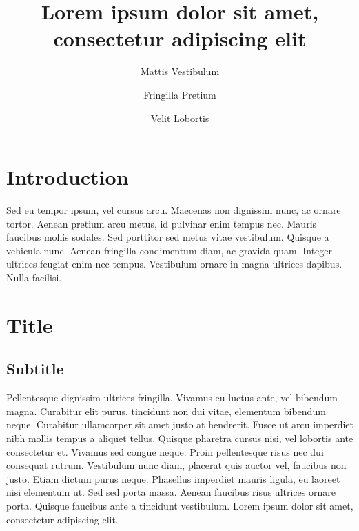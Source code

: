 \documentclass{jdmdh}
\title{Lorem ipsum dolor sit amet, consectetur adipiscing elit}
\author[1]{Mattis Vestibulum}
\author[2]{Fringilla Pretium}
\author[1]{Velit Lobortis}
\affil[1]{University One, Country A}
\affil[2]{University Two, Country B}
\begin{document}
\maketitle



\section{Introduction}

\strut
\vspace{-4ex}

Sed eu tempor ipsum, vel cursus arcu. Maecenas non dignissim nunc, ac ornare tortor. Aenean
pretium arcu metus, id pulvinar enim tempus nec. Mauris faucibus mollis sodales. Sed
porttitor sed metus vitae vestibulum. Quisque a vehicula nunc. Aenean fringilla condimentum
diam, ac gravida quam. Integer ultrices feugiat enim nec tempus. Vestibulum ornare in magna
ultrices dapibus. Nulla facilisi. 

\section{Title}

\subsection{Subtitle}
Pellentesque dignissim ultrices fringilla. Vivamus eu luctus ante, vel bibendum magna.
Curabitur elit purus, tincidunt non dui vitae, elementum bibendum neque. Curabitur
ullamcorper sit amet justo at hendrerit. Fusce ut arcu imperdiet nibh mollis tempus a aliquet
tellus. Quisque pharetra cursus nisi, vel lobortis ante consectetur et. Vivamus sed congue
neque. Proin pellentesque risus nec dui consequat rutrum. Vestibulum nunc diam, placerat
quis auctor vel, faucibus non justo. Etiam dictum purus neque. Phasellus imperdiet mauris
ligula, eu laoreet nisi elementum ut. Sed sed porta massa. Aenean faucibus risus ultrices
ornare porta. Quisque faucibus ante a tincidunt vestibulum. Lorem ipsum dolor sit amet,
consectetur adipiscing elit.
\end{document}
